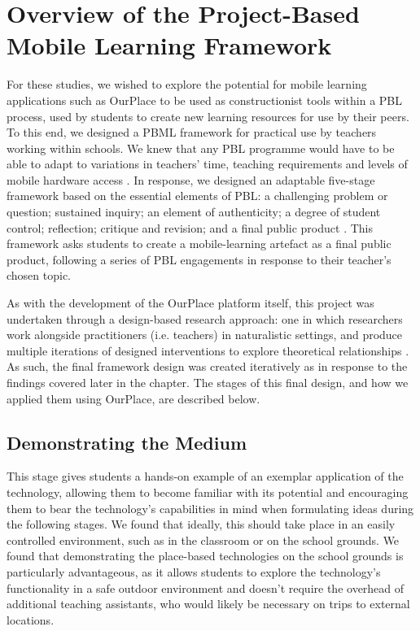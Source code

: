 \section{Overview of the Project-Based Mobile Learning Framework}
For these studies, we wished to explore the potential for mobile learning applications such as OurPlace to be used as constructionist tools within a PBL process, used by students to create new learning resources for use by their peers. To this end, we designed a PBML framework for practical use by teachers working within schools. We knew that any PBL programme would have to be able to adapt to variations in teachers' time, teaching requirements and levels of mobile hardware access \citep{Blumenfeld1991, Krajcik2006, InnovationUnit2016, TheEducationEndowmentFoundation2016}. In response, we designed an adaptable five-stage framework based on the essential elements of PBL: a challenging problem or question; sustained inquiry; an element of authenticity; a degree of student control; reflection; critique and revision; and a final public product \citep{Larmer2015}. This framework asks students to create a mobile-learning artefact as a final public product, following a series of PBL engagements in response to their teacher's chosen topic. 

As with the development of the OurPlace platform itself, this project was undertaken through a design-based research approach: one in which researchers work alongside practitioners (i.e. teachers) in naturalistic settings, and produce multiple iterations of designed interventions to explore theoretical relationships \citep{Barab2004}. As such, the final framework design was created iteratively as in response to the findings covered later in the chapter. The stages of this final design, and how we applied them using OurPlace, are described below.

\subsection{Demonstrating the Medium}
This stage gives students a hands-on example of an exemplar application of the technology, allowing them to become familiar with its potential and encouraging them to bear the technology's capabilities in mind when formulating ideas during the following stages. We found that ideally, this should take place in an easily controlled environment, such as in the classroom or on the school grounds. We found that demonstrating the place-based technologies on the school grounds is particularly advantageous, as it allows students to explore the technology's functionality in a safe outdoor environment and doesn't require the overhead of additional teaching assistants, who would likely be necessary on trips to external locations. 


